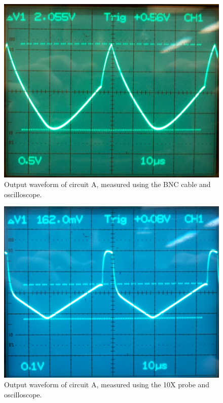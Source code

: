 \documentclass[12pt,letterpaper]{report}
\newlength \figwidth
\begin{document}
\begin{figure}
\centering
\includegraphics[width=\figwidth, keepaspectratio=true]{lab2/lab2_images/BNC_CircuitA.png}
\caption{Output waveform of circuit A, measured using the BNC cable and oscilloscope.}
\label{fig:bnc_circuit_A}
\end{figure}

\begin{figure}
\centering
\includegraphics[width=\figwidth, keepaspectratio=true]{lab2/lab2_images/10x_CircuitA_2.png}
\caption{Output waveform of circuit A, measured using the 10X probe and oscilloscope.}
\label{fig:10x_circuit_A}
\end{figure}
\end{document}
